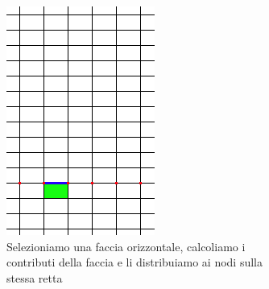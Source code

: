 \documentclass[a4paper,10pt]{report}
\theoremstyle{plain}
\theoremstyle{definition}
\theoremstyle{remark}
\begin{document}
\begin{figure}[p]
  \begin{subfigure}[t]{.48\linewidth}
 \centering
 \includegraphics[width=.85\linewidth]{img/Integrating_on_x}
 \caption{Selezioniamo una faccia orizzontale, calcoliamo i contributi della faccia e li distribuiamo ai nodi sulla stessa retta}
 \label{fig:integrating_x}
 \vspace{4ex}
 \end{subfigure}
 \hfill
  \begin{subfigure}[t]{.48\linewidth}
 \centering

\end{subfigure}
\end{figure}
\end{document}
